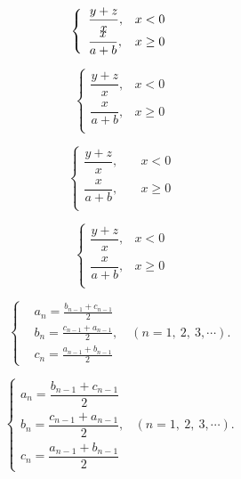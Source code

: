 \[
\left\{ \begin{array}{l l}
	\dfrac{y+z}{x}, & x<0 \\
	\dfrac{x}{a+b}, & x\ge0 \\
\end{array} \right.
\]

\[
\begin{cases}
	\dfrac{y+z}{x}, & x<0 \\
	\dfrac{x}{a+b}, & x\ge0 \\
\end{cases}
\]

\[
\left\{ \begin{aligned}
	\dfrac{y+z}{x}, \quad& x<0 \\
	\dfrac{x}{a+b}, \quad& x\ge0 \\
\end{aligned} \right.
\]

\[
\left\{ \begin{matrix}
	\dfrac{y+z}{x}, & x<0 \\
	\dfrac{x}{a+b}, & x\ge0 \\
\end{matrix} \right.
\]

\begin{equation*}
	\left\{
	\begin{aligned}
		&a_n=\frac{b_{n-1}+c_{n-1}}{2} \\
		&b_n=\frac{c_{n-1}+a_{n-1}}{2},\quad(n=1,~2,~3,\cdots). \\
		&c_n=\frac{a_{n-1}+b_{n-1}}{2}
	\end{aligned}
	\right.
\end{equation*}

\[
\begin{cases}
	a_n=\dfrac{b_{n-1}+c_{n-1}}{2} \\
	b_n=\dfrac{c_{n-1}+a_{n-1}}{2}, &(n=1,~2,~3,\cdots). \\
	c_n=\dfrac{a_{n-1}+b_{n-1}}{2}
\end{cases}
\]
